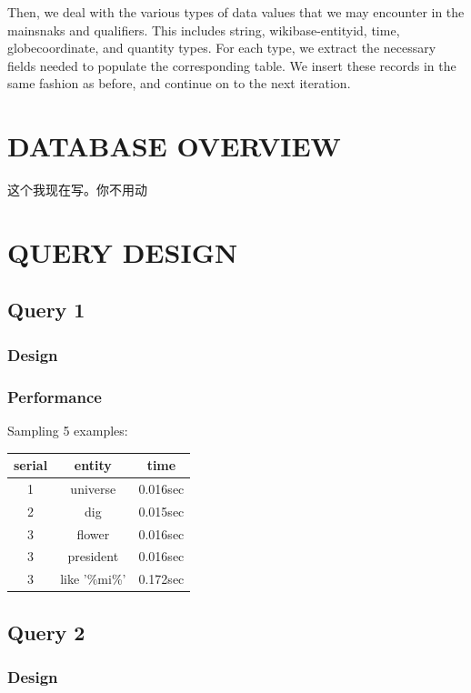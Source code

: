 \documentclass[12pt]{article}
\begin{document}
Then, we deal with the various types of data values that we may encounter in the mainsnaks and qualifiers. This includes string, wikibase-entityid, time, globecoordinate, and quantity types. For each type, we extract the necessary fields needed to populate the corresponding table. We insert these records in the same fashion as before, and continue on to the next iteration.

\section{DATABASE OVERVIEW}
这个我现在写。你不用动

\section{QUERY DESIGN}
\subsection{Query 1}
\subsubsection{Design}
\subsubsection{Performance}
Sampling 5 examples:
\begin{center}
  \begin{tabular}{ | c | c | c |}
    \hline
    serial & entity & time \\ \hline
    1 & universe & 0.016sec \\ \hline
    2 & dig & 0.015sec \\ \hline
    3 & flower & 0.016sec \\ \hline
    3 & president & 0.016sec \\ \hline
    3 & like '\%mi\%' & 0.172sec \\
    \hline
  \end{tabular}
\end{center}
\subsection{Query 2}
\subsubsection{Design}
\end{document}
